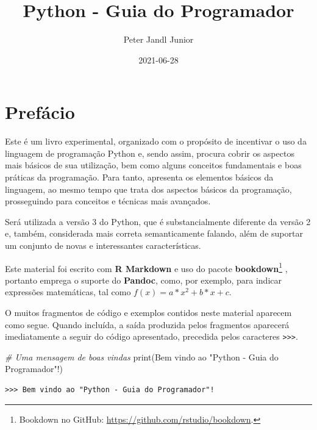\documentclass[
]{book}
\title{Python - Guia do Programador}
\author{Peter Jandl Junior}
\date{2021-06-28}
\newenvironment{Shaded}{\begin{snugshade}}{\end{snugshade}}
\newcommand{\BuiltInTok}[1]{#1}
\newcommand{\CommentTok}[1]{\textcolor[rgb]{0.56,0.35,0.01}{\textit{#1}}}
\newcommand{\NormalTok}[1]{#1}
\newcommand{\StringTok}[1]{\textcolor[rgb]{0.31,0.60,0.02}{#1}}
\begin{document}
\maketitle

{
\setcounter{tocdepth}{1}
\tableofcontents
}
\hypertarget{prefuxe1cio}{%
\chapter*{Prefácio}\label{prefuxe1cio}}

Este é um livro experimental, organizado com o propósito de incentivar o uso da linguagem de programação Python e, sendo assim, procura cobrir os aspectos mais básicos de sua utilização, bem como alguns conceitos fundamentais e boas práticas da programação. Para tanto, apresenta os elementos básicos da linguagem, ao mesmo tempo que trata dos aspectos básicos da programação, prosseguindo para conceitos e técnicas mais avançados.

Será utilizada a versão 3 do Python, que é substancialmente diferente da versão 2 e, também, considerada mais correta semanticamente falando, além de suportar um conjunto de novas e interessantes características.

Este material foi escrito com \textbf{R Markdown} e uso do pacote \textbf{bookdown}\footnote{Bookdown no GitHub: \url{https://github.com/rstudio/bookdown}.} \citep{R-bookdown, xie2015}, portanto emprega o suporte do \textbf{Pandoc}, como, por exemplo, para indicar expressões matemáticas, tal como \(f(x) = a*x^2 + b*x + c\).

O muitos fragmentos de código e exemplos contidos neste material aparecem como segue. Quando incluída, a saída produzida pelos fragmentos aparecerá imediatamente a seguir do código apresentado, precedida pelos caracteres \texttt{\textgreater{}\textgreater{}\textgreater{}}.

\begin{Shaded}
\begin{Highlighting}[]
\CommentTok{\# Uma mensagem de boas vindas}
\BuiltInTok{print}\NormalTok{(}\StringTok{\textquotesingle{}Bem vindo ao "Python {-} Guia do Programador"!\textquotesingle{}}\NormalTok{)}
\end{Highlighting}
\end{Shaded}

\begin{verbatim}
>>> Bem vindo ao "Python - Guia do Programador"!
\end{verbatim}
\end{document}
